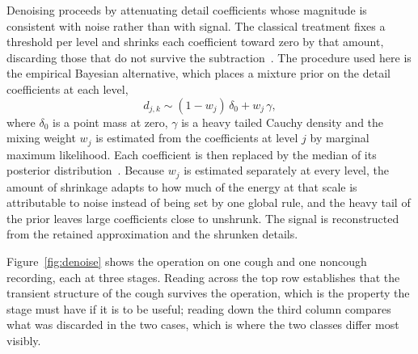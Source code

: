\documentclass[pdflatex,sn-mathphys-num]{sn-jnl}
\begin{document}
Denoising proceeds by attenuating detail coefficients whose magnitude is
consistent with noise rather than with signal. The classical treatment fixes
a threshold per level and shrinks each coefficient toward zero by that
amount, discarding those that do not survive the
subtraction~\cite{donoho1994, donoho1995}. The procedure used here is the
empirical Bayesian alternative, which places a mixture prior on the detail
coefficients at each level,
\begin{equation}
d_{j,k} \sim (1 - w_j)\,\delta_0 + w_j\,\gamma,
\label{eq:eb}
\end{equation}
where $\delta_0$ is a point mass at zero, $\gamma$ is a heavy tailed Cauchy
density and the mixing weight $w_j$ is estimated from the coefficients at
level $j$ by marginal maximum likelihood. Each coefficient is then replaced
by the median of its posterior distribution~\cite{johnstone2005}. Because
$w_j$ is estimated separately at every level, the amount of shrinkage adapts
to how much of the energy at that scale is attributable to noise instead of
being set by one global rule, and the heavy tail of the prior leaves large
coefficients close to unshrunk. The signal is reconstructed from the retained
approximation and the shrunken details.

Figure~\ref{fig:denoise} shows the operation on one cough and one noncough
recording, each at three stages. Reading across the top row establishes that
the transient structure of the cough survives the operation, which is the
property the stage must have if it is to be useful; reading down the third
column compares what was discarded in the two cases, which is where the two
classes differ most visibly.
\end{document}
